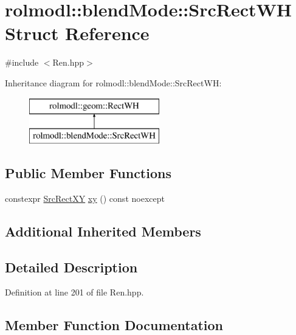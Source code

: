 \hypertarget{structrolmodl_1_1blend_mode_1_1_src_rect_w_h}{}\section{rolmodl\+::blend\+Mode\+::Src\+Rect\+WH Struct Reference}
\label{structrolmodl_1_1blend_mode_1_1_src_rect_w_h}


{\ttfamily \#include $<$Ren.\+hpp$>$}

Inheritance diagram for rolmodl\+::blend\+Mode\+::Src\+Rect\+WH\+:\begin{figure}[H]
\begin{center}
\leavevmode
\includegraphics[height=2.000000cm]{structrolmodl_1_1blend_mode_1_1_src_rect_w_h}
\end{center}
\end{figure}
\subsection*{Public Member Functions}
\begin{DoxyCompactItemize}
\item 
constexpr \mbox{\hyperlink{structrolmodl_1_1blend_mode_1_1_src_rect_x_y}{Src\+Rect\+XY}} \mbox{\hyperlink{structrolmodl_1_1blend_mode_1_1_src_rect_w_h_a47d281ee2ed76c0b789dbcb06db95f59}{xy}} () const noexcept
\end{DoxyCompactItemize}
\subsection*{Additional Inherited Members}


\subsection{Detailed Description}


Definition at line 201 of file Ren.\+hpp.



\subsection{Member Function Documentation}
\mbox{\label{structrolmodl_1_1blend_mode_1_1_src_rect_w_h_a47d281ee2ed76c0b789dbcb06db95f59}} 
